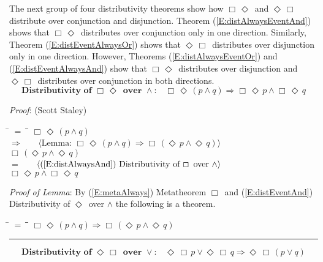\documentclass[12pt, fleqn, leqno]{article}
\newcommand{\lgap}{2pt}                             %
\newcommand{\mymathindent}{24pt}                    %
\newcommand{\impl}{\ensuremath{\Rightarrow}}        %
\newcommand{\Event}{\Diamond\,}
\newcommand{\Always}{\Box\,}
\newcommand{\myqed}{\rule[-.23ex]{1.2ex}{2.0ex}}
\newcommand{\myqedtab}{\hspace{384pt}}              %
\newcommand{\Gll} {\langle}                         %
\newcommand{\Ggg} {\rangle}                         %
\newcommand{\Hint}[1]     {\ \ \ $\Gll              \mbox{#1} \Ggg$ }   %
\begin{document}
The next group of four distributivity theorems show how $\Always\Event$ and $\Event\Always$
distribute over conjunction and disjunction.
Theorem (\ref{E:distAlwaysEventAnd}) shows that $\Always\Event$ distributes over conjunction only in one direction.
Similarly, Theorem (\ref{E:distEventAlwaysOr}) shows that $\Event\Always$ distributes over disjunction only in one direction.
However, Theorems (\ref{E:distAlwaysEventOr}) and (\ref{E:distEventAlwaysAnd}) show that $\Always\Event$ distributes over
disjunction and $\Event\Always$ distributes over conjunction in both directions.
\begin{equation}\label{E:distAlwaysEventAnd}
\textbf{Distributivity of $\Always\Event$ over $\land$:}\quad \Always\Event(p \land q) \impl \Always\Event p \land \Always\Event q
\end{equation}

\emph{Proof}: (Scott Staley)
\begin{tabbing}
\hspace{\mymathindent} \= $= \;$ \= \myqedtab \= \kill
  \> \>   $\Always\Event(p \land q)$\\[\lgap]
  \> $\impl$  \>  \Hint{Lemma: $\Always\Event(p \land q) \impl \Always(\Event p \land \Event q)$}\\[\lgap]
  \> \>   $\Always(\Event p \land \Event q)$\\[\lgap]
  \> $=$  \>  \Hint{(\ref{E:distAlwaysAnd}) Distributivity of $\Always$ over $\land$}\\[\lgap]
  \> \>   $\Always\Event p \land \Always\Event q$
\end{tabbing}

\emph{Proof of Lemma}:
By (\ref{E:metaAlways}) Metatheorem $\Always$ and (\ref{E:distEventAnd}) Distributivity of $\Event$ over $\land$ the following is a theorem.
\begin{tabbing}
\hspace{\mymathindent} \= $= \;$ \= \myqedtab \= \kill
  \> \>   $\Always\Event(p \land q) \impl \Always(\Event p \land \Event q)$ \quad \myqed
\end{tabbing}
\begin{equation}\label{E:distEventAlwaysOr}
\textbf{Distributivity of $\Event\Always$ over $\lor$:}\quad \Event\Always p \lor \Event\Always q \impl \Event\Always (p \lor q)
\end{equation}
\end{document}
